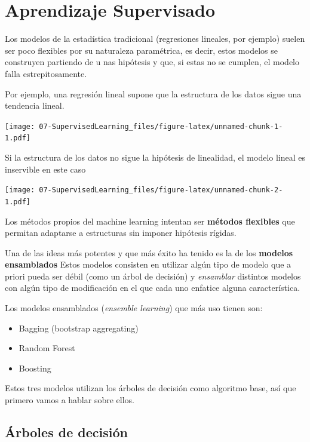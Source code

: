 \documentclass[]{book}
\providecommand{\tightlist}{%
  \setlength{\itemsep}{0pt}\setlength{\parskip}{0pt}}
\begin{document}
\hypertarget{aprendizaje-supervisado}{%
\chapter{Aprendizaje Supervisado}\label{aprendizaje-supervisado}}

Los modelos de la estadística tradicional (regresiones lineales, por ejemplo) suelen ser poco flexibles por su naturaleza paramétrica, es decir, estos modelos se construyen partiendo de u
nas hipótesis y que, si estas no se cumplen, el modelo falla estrepitosamente.

Por ejemplo, una regresión lineal supone que la estructura de los datos sigue una tendencia lineal.

\texttt{[image: 07-SupervisedLearning\_files/figure-latex/unnamed-chunk-1-1.pdf]}

Si la estructura de los datos no sigue la hipótesis de linealidad, el modelo lineal es inservible en este caso

\texttt{[image: 07-SupervisedLearning\_files/figure-latex/unnamed-chunk-2-1.pdf]}

Los métodos propios del machine learning intentan ser \textbf{métodos flexibles} que permitan adaptarse a estructuras sin imponer hipótesis rígidas.

Una de las ideas más potentes y que más éxito ha tenido es la de los \textbf{modelos ensamblados} Estos modelos consisten en utilizar algún tipo de modelo que a priori pueda ser débil (como un árbol de decisión) y \emph{ensamblar} distintos modelos con algún tipo de modificación en el que cada uno enfatice alguna característica.

Los modelos ensamblados (\emph{ensemble learning}) que más uso tienen son:

\begin{itemize}
\tightlist
\item
  Bagging (bootstrap aggregating)
\item
  Random Forest
\item
  Boosting
\end{itemize}

Estos tres modelos utilizan los árboles de decisión como algoritmo base, así que primero vamos a hablar sobre ellos.

\hypertarget{arboles-de-decision}{%
\section{Árboles de decisión}\label{arboles-de-decision}}
\end{document}
